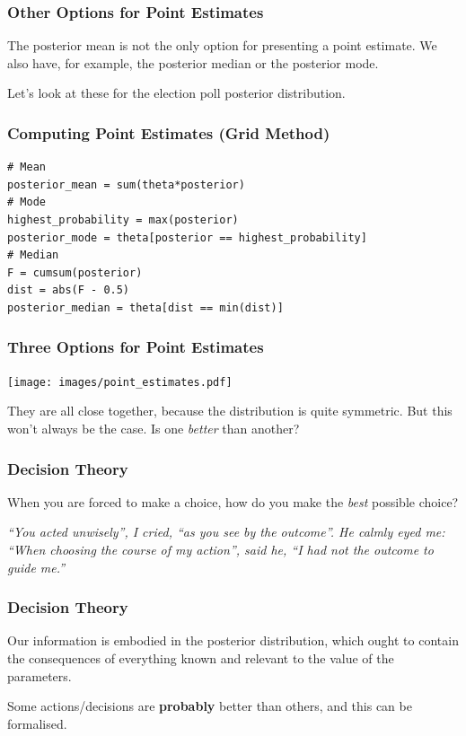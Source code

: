 \documentclass{beamer}
\begin{document}
\begin{frame}
\frametitle{Other Options for Point Estimates}
The posterior mean is not the only option for presenting a point estimate.
We also have, for example, the posterior median or the posterior mode.\\[0.5em]\pause

Let's look at these for the election poll posterior distribution.
\end{frame}

\begin{frame}[fragile]
\frametitle{Computing Point Estimates (Grid Method)}

\begin{verbatim}
# Mean
posterior_mean = sum(theta*posterior)
# Mode
highest_probability = max(posterior)
posterior_mode = theta[posterior == highest_probability]
# Median
F = cumsum(posterior)
dist = abs(F - 0.5)
posterior_median = theta[dist == min(dist)]
\end{verbatim}

\end{frame}



\begin{frame}
\frametitle{Three Options for Point Estimates}
\begin{center}
\texttt{[image: images/point\_estimates.pdf]}
\end{center}

They are all close together, because the distribution is quite symmetric.
But this won't always be the case. Is one {\em better} than another?

\end{frame}



\begin{frame}
\frametitle{Decision Theory}
When you are forced to make a choice, how do you make the {\em best} possible
choice?\\[0.7em]
\pause

{\em 
``You acted unwisely'', I cried, ``as you see
by the outcome''. He calmly eyed me:
``When choosing the course of my action'', said he, ``I had
not the outcome to guide me.''
}

\end{frame}


\begin{frame}
\frametitle{Decision Theory}
Our information is embodied in the posterior distribution,
which ought to contain the consequences of everything
known and relevant to the value of the parameters.
\pause

Some actions/decisions are {\bf probably} better than others,
and this can be formalised.
\end{frame}
\end{document}
